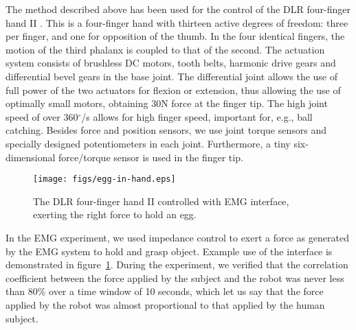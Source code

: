 The method described above has been used for the control of the DLR
four-finger hand II \cite{ButFisGre2004}. This is a four-finger hand
with thirteen active degrees of freedom: three per finger, and one for
opposition of the thumb.  In the four identical fingers, the motion of
the third phalanx is coupled to that of the second. The actuation
system consists of brushless DC motors, tooth belts, harmonic drive
gears and differential bevel gears in the base joint. The differential
joint allows the use of full power of the two actuators for flexion or
extension, thus allowing the use of optimally small motors, obtaining
30N force at the finger tip. The high joint speed of over
360$^\circ$/s allows for high finger speed, important for, e.g., ball
catching. Besides force and position sensors, we use joint torque
sensors and specially designed potentiometers in each joint.
Furthermore, a tiny six-dimensional force/torque sensor is used in the
finger tip.

\begin{figure}
  \texttt{[image: figs/egg-in-hand.eps]}
  \caption{The DLR four-finger hand II controlled with EMG interface, exerting the right force to hold an egg.}
  \label{fig:egg-hand}
\end{figure}

In the EMG experiment, we used impedance control to exert a force as
generated by the EMG system to hold and grasp object. Example use of
the interface is demonstrated in figure~\ref{fig:egg-hand}. During the
experiment, we verified that the correlation coefficient between the
force applied by the subject and the robot was never less than $80\%$
over a time window of 10 seconds, which let us say that the force
applied by the robot was almost proportional to that applied by the
human subject.
